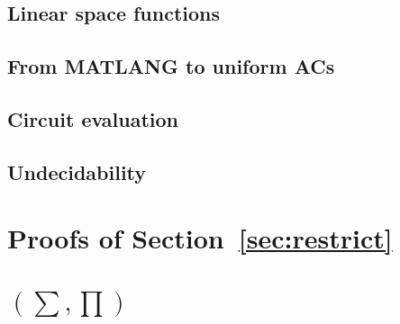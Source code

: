 \subsection{Linear space functions}


\subsection{From MATLANG to uniform ACs}


\subsection{Circuit evaluation}


\subsection{Undecidability}



\section{Proofs of Section~\ref{sec:restrict}}



\section{\lang$(\sum,\prod)$}


